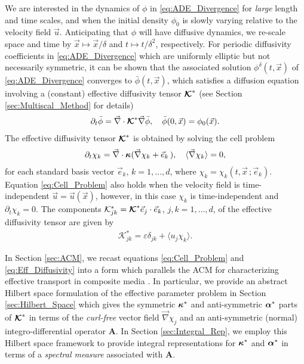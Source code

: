 \documentclass[11pt]{amsart}
\newcommand{\Hb}{\mathbf{H}}
\newcommand{\Ib}{\mathbf{I}}
\newcommand{\Ab}{\mathbf{A}}
\newcommand{\Kc}{\mathcal{K}}
\newcommand\Kbc{\mbox{\boldmath${\mathcal{K}}$}}
\newcommand\balpha{\mbox{\boldmath${\alpha}$}}
\newcommand\bkappa{\mbox{\boldmath${\kappa}$}}
\begin{document}
We are interested in the dynamics of $\phi$ in \eqref{eq:ADE_Divergence}
for \emph{large} length and time scales, and when the initial density
$\phi_0$ is slowly varying relative to the velocity field
$\vec{u}$. Anticipating that $\phi$ will have diffusive dynamics, we
re-scale space and time by $\vec{x}\mapsto\vec{x}/\delta$ and $t\mapsto t/\delta^2$,
respectively.  For periodic diffusivity coefficients in
\eqref{eq:ADE_Divergence} which are uniformly elliptic but not
necessarily symmetric, it can be shown \cite{Fannjiang:SIAM_JAM:333}
that the associated solution $\phi^\delta(t,\vec{x})$ of
\eqref{eq:ADE_Divergence} converges to $\bar{\phi}(t,\vec{x})$, which
satisfies a diffusion equation involving a (constant) effective
diffusivity tensor $\Kbc^*$ (see Section \ref{sec:Multiscal_Method}
for details)   
%
\begin{align}\label{eq:phi_bar}
  \partial_t\bar{\phi}=\vec{\nabla}\cdot\Kbc^*\vec{\nabla}\bar{\phi}, \quad
  \bar{\phi}(0,\vec{x})=\phi_0(\vec{x}).
\end{align}
%
The effective diffusivity tensor $\Kbc^*$ is obtained by solving
the cell problem \cite{Fannjiang:SIAM_JAM:333}
% 
\begin{align}\label{eq:Cell_Problem}
  \partial_t\chi_k=\vec{\nabla}\cdot\bkappa(\vec{\nabla}\chi_k+\vec{e}_k\,), \quad
  \langle\vec{\nabla}\chi_k\rangle=0,
\end{align}
%
for each standard basis vector $\vec{e}_k$, $k=1,\ldots,d$, where
$\chi_k=\chi_k(t,\vec{x}\,;\vec{e}_k)$. Equation \eqref{eq:Cell_Problem}
also holds \cite{Fannjiang:SIAM_JAM:333} when the velocity field is
time-independent $\vec{u}=\vec{u}(\vec{x})$, however, in this case
$\chi_k$ is time-independent and $\partial_t\chi_k=0$. The components
$\Kc^*_{jk}=\Kbc^*\vec{e}_j\cdot\vec{e}_k$, $j,k=1,\ldots,d$, of the effective
diffusivity tensor are given by 
%
\begin{align}\label{eq:Eff_Diffusivity}
  \Kc^*_{jk}=\varepsilon\delta_{jk}+\langle u_j\chi_k\rangle.
\end{align}
%



In Section \ref{sec:ACM},  we recast equations \eqref{eq:Cell_Problem}
and \eqref{eq:Eff_Diffusivity} into a form which parallels the ACM for
characterizing effective transport in composite media
\cite{Golden:CMP-473}. In particular, we provide an abstract Hilbert
space formulation of the effective parameter problem in Section
\ref{sec:Hilbert_Space} which gives the symmetric $\bkappa^*$ and
anti-symmetric $\balpha^*$ parts of $\Kbc^*$ in terms of the
\emph{curl-free} vector field $\vec{\nabla}\chi_j$ and an anti-symmetric (normal)
integro-differential operator $\Ab$. In Section \ref{sec:Integral_Rep},
we employ this Hilbert space framework to provide integral
representations for $\bkappa^*$ and $\balpha^*$ in terms of a
\emph{spectral measure} associated with $\Ab$. 
\end{document}
